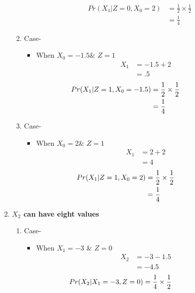 \documentclass[11pt,a4paper,twocolumn]{article}
\begin{document}
\begin{enumerate}
\begin{enumerate}
\begin{align*}
          Pr(X_{1}|Z=0,X_{0}=2)&=\frac{1}{2}\times\frac{1}{2}\\
        &=\frac{1}{4}
        \end{align*}
       \item Case-
       \begin{itemize}
           \item When $X_{0}=-1.5$\& $Z=1$
           \begin{align*}
         X_{1}&=-1.5+2\\
         &=.5
         \end{align*}
         \begin{align*}
        \hspace{-2cm}
          Pr(X_{1}|Z=1,X_{0}=-1.5)&=\frac{1}{2}\times\frac{1}{2}\\
        &=\frac{1}{4}
        \end{align*}
       \end{itemize}
         \item Case-
         \begin{itemize}
             \item  When $X_{0}=2$\& $Z=1$
             \begin{align*}
         X_{1}&=2+2\\
         &=4
         \end{align*}
         \begin{align*}
        \hspace{-2cm}
          Pr(X_{1}|Z=1,X_{0}=2)&=\frac{1}{2}\times\frac{1}{2}\\
        &=\frac{1}{4}
        \end{align*}
         \end{itemize}
    \end{enumerate}
    \item \textbf{$X_{2}$ can have eight values}
    \begin{enumerate}
        \item Case-
\begin{itemize}
    \item When $X_{1}=-3$ \& $Z=0$
    \begin{align*}
        X_{2}&=-3-1.5\\
        &=-4.5
    \end{align*}
    \begin{align*}
    \hspace{-2.5cm}
        Pr(X_{2}|X_{1}=-3,Z=0)&=\frac{1}{4}\times\frac{1}{2}\\

\end{align*}
\end{itemize}
\end{enumerate}
\end{enumerate}
\end{document}

